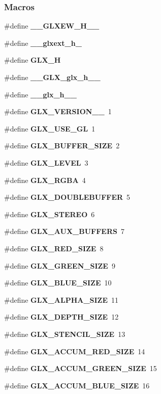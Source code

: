 \subsubsection*{Macros}
\begin{DoxyCompactItemize}
\item 
\#define {\bf \+\_\+\+\_\+\+G\+L\+X\+E\+W\+\_\+\+H\+\_\+\+\_\+}
\item 
\#define {\bf \+\_\+\+\_\+glxext\+\_\+h\+\_\+}
\item 
\#define {\bf G\+L\+X\+\_\+H}
\item 
\#define {\bf \+\_\+\+\_\+\+G\+L\+X\+\_\+glx\+\_\+h\+\_\+\+\_\+}
\item 
\#define {\bf \+\_\+\+\_\+glx\+\_\+h\+\_\+\+\_\+}
\item 
\#define {\bf G\+L\+X\+\_\+\+V\+E\+R\+S\+I\+O\+N\+\_\+\_}~1
\item 
\#define {\bf G\+L\+X\+\_\+\+U\+S\+E\+\_\+\+GL}~1
\item 
\#define {\bf G\+L\+X\+\_\+\+B\+U\+F\+F\+E\+R\+\_\+\+S\+I\+ZE}~2
\item 
\#define {\bf G\+L\+X\+\_\+\+L\+E\+V\+EL}~3
\item 
\#define {\bf G\+L\+X\+\_\+\+R\+G\+BA}~4
\item 
\#define {\bf G\+L\+X\+\_\+\+D\+O\+U\+B\+L\+E\+B\+U\+F\+F\+ER}~5
\item 
\#define {\bf G\+L\+X\+\_\+\+S\+T\+E\+R\+EO}~6
\item 
\#define {\bf G\+L\+X\+\_\+\+A\+U\+X\+\_\+\+B\+U\+F\+F\+E\+RS}~7
\item 
\#define {\bf G\+L\+X\+\_\+\+R\+E\+D\+\_\+\+S\+I\+ZE}~8
\item 
\#define {\bf G\+L\+X\+\_\+\+G\+R\+E\+E\+N\+\_\+\+S\+I\+ZE}~9
\item 
\#define {\bf G\+L\+X\+\_\+\+B\+L\+U\+E\+\_\+\+S\+I\+ZE}~10
\item 
\#define {\bf G\+L\+X\+\_\+\+A\+L\+P\+H\+A\+\_\+\+S\+I\+ZE}~11
\item 
\#define {\bf G\+L\+X\+\_\+\+D\+E\+P\+T\+H\+\_\+\+S\+I\+ZE}~12
\item 
\#define {\bf G\+L\+X\+\_\+\+S\+T\+E\+N\+C\+I\+L\+\_\+\+S\+I\+ZE}~13
\item 
\#define {\bf G\+L\+X\+\_\+\+A\+C\+C\+U\+M\+\_\+\+R\+E\+D\+\_\+\+S\+I\+ZE}~14
\item 
\#define {\bf G\+L\+X\+\_\+\+A\+C\+C\+U\+M\+\_\+\+G\+R\+E\+E\+N\+\_\+\+S\+I\+ZE}~15
\item 
\#define {\bf G\+L\+X\+\_\+\+A\+C\+C\+U\+M\+\_\+\+B\+L\+U\+E\+\_\+\+S\+I\+ZE}~16

\end{DoxyCompactItemize}
